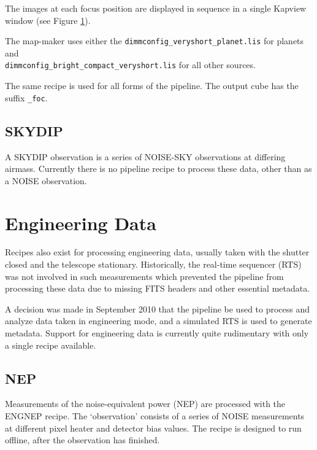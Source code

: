 \documentclass[twoside,11pt]{article}
\newcommand{\xlabel}[1]{}
\renewcommand{\_}{\texttt{\symbol{95}}}
\newcommand{\task}[1]{\textsf{#1}}
\begin{document}
The images at each focus position are displayed in sequence in a
single Kapview window (see Figure \ref{fig:focus}).

\begin{figure}
\centering
\caption{\label{fig:focus}}
\end{figure}

The map-maker uses either the \verb+dimmconfig_veryshort_planet.lis+
for planets and \\ \verb+dimmconfig_bright_compact_veryshort.lis+ for
all other sources.

The same recipe is used for all forms of the pipeline. The output cube
has the suffix \verb+_foc+.

\subsection{SKYDIP}

A SKYDIP observation is a series of NOISE-SKY observations at
differing airmass. Currently there is no pipeline recipe to process
these data, other than as a NOISE observation.


\section{\xlabel{engineering}Engineering Data\label{se:eng}}

Recipes also exist for processing engineering data, usually taken with
the shutter closed and the telescope stationary. Historically, the
real-time sequencer (RTS) was not involved in such measurements which
prevented the pipeline from processing these data due to missing FITS
headers and other essential metadata.

A decision was made in September 2010 that the pipeline be used to
process and analyze data taken in engineering mode, and a simulated
RTS is used to generate metadata. Support for engineering data is
currently quite rudimentary with only a single recipe available.

\subsection{NEP}

Measurements of the noise-equivalent power (NEP) are processed with
the \task{ENG\_NEP} recipe. The `observation' consists of a series of
NOISE measurements at different pixel heater and detector bias
values. The recipe is designed to run offline, after the observation
has finished.
\end{document}
